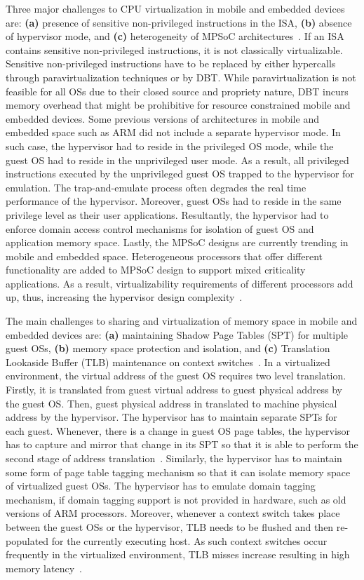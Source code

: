 \documentclass[journal, 10pt]{IEEEtran}
\begin{document}
Three major challenges to CPU virtualization in mobile and embedded devices are: \textbf{(a)} presence of sensitive non-privileged instructions in the ISA, \textbf{(b)} absence of hypervisor mode, and \textbf{(c)} heterogeneity of MPSoC architectures~\cite{Dall2014,Brash2010}. If an ISA contains sensitive non-privileged instructions, it is not classically virtualizable. Sensitive non-privileged instructions have to be replaced by either hypercalls through paravirtualization techniques or by DBT. While paravirtualization is not feasible for all OSs due to their closed source and propriety nature, DBT incurs memory overhead that might be prohibitive for resource constrained mobile and embedded devices. Some previous versions of architectures in mobile and embedded space such as ARM did not include a separate hypervisor mode. In such case, the hypervisor had to reside in the privileged OS mode, while the guest OS had to reside in the unprivileged user mode. As a result, all privileged instructions executed by the unprivileged guest OS trapped to the hypervisor for emulation. The trap-and-emulate process often degrades the real time performance of the hypervisor. Moreover, guest OSs had to reside in the same privilege level as their user applications. Resultantly, the hypervisor had to enforce domain access control mechanisms for isolation of guest OS and application memory space. Lastly, the MPSoC designs are currently trending in mobile and embedded space. Heterogeneous processors that offer different functionality are added to MPSoC design to support mixed criticality applications. As a result, virtualizability requirements of different processors add up, thus, increasing the hypervisor design complexity~\cite{Aguiar2011a}. 

The main challenges to sharing and virtualization of memory space in mobile and embedded devices are: \textbf{(a)} maintaining Shadow Page Tables (SPT) for multiple guest OSs, \textbf{(b)} memory space protection and isolation, and \textbf{(c)} Translation Lookaside Buffer (TLB) maintenance on context switches~\cite{Dall2013}. In a virtualized environment, the virtual address of the guest OS requires two level translation. Firstly, it is translated from guest virtual address to guest physical address by the guest OS. Then, guest physical address in translated to machine physical address by the hypervisor. The hypervisor has to maintain separate SPTs for each guest. Whenever, there is a change in guest OS page tables, the hypervisor has to capture and mirror that change in its SPT so that it is able to perform the second stage of address translation~\cite{Mijat2011}. Similarly, the hypervisor has to maintain some form of page table tagging mechanism so that it can isolate memory space of virtualized guest OSs. The hypervisor has to emulate domain tagging mechanism, if domain tagging support is not provided in hardware, such as old versions of ARM processors. Moreover, whenever a context switch takes place between the guest OSs or the hypervisor, TLB needs to be flushed and then re-populated for the currently executing host. As such context switches occur frequently in the virtualized environment, TLB misses increase resulting in high memory latency~\cite{Hwang2008}. 
\end{document}
